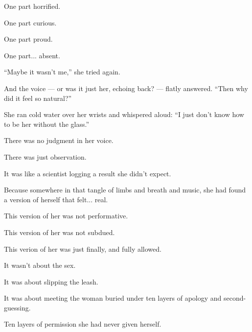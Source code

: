 One part horrified. 

One part curious. 

One part proud.

One part... absent.

``Maybe it wasn’t me,'' she tried again.

And the voice --- or was it just her, echoing back? --- flatly answered.
``Then why did it feel so natural?''

She ran cold water over her wrists and whispered aloud:
``I just don’t know how to be her without the glass.''

There was no judgment in her voice. 

There was just observation. 

It was like a scientist logging a result she didn’t expect.

Because somewhere in that tangle of limbs and breath and music, she had found a version of herself that 
felt... real.

This version of her was not performative. 

This version of her was not subdued. 

This verion of her was just finally, and fully allowed.

It wasn’t about the sex.

It was about slipping the leash.

It was about meeting the woman buried under ten layers of apology and second-guessing.

Ten layers of permission she had never given herself.

